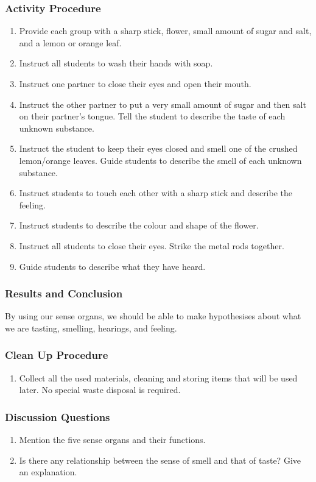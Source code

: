 \subsubsection*{Activity Procedure}
\begin{enumerate}
\item{Provide each group with a sharp stick, flower, small amount of sugar and salt, and a lemon or orange leaf.}
\item{Instruct all students to wash their hands with soap.}
\item{Instruct one partner to close their eyes and open their mouth.}
\item{Instruct the other partner to put a very small amount of sugar and then salt on their partner's tongue. Tell the student to describe the taste of each unknown substance.}
\item{Instruct the student to keep their eyes closed and smell one of the crushed lemon/orange leaves. Guide students to describe the smell of each unknown substance.}
\item{Instruct students to touch each other with a sharp stick and describe the feeling.}
\item{Instruct students to describe the colour and shape of the flower.}
\item{Instruct all students to close their eyes. Strike the metal rods together.}
\item{Guide students to describe what they have heard.}
\end{enumerate}

\subsubsection*{Results and Conclusion}
By using our sense organs, we should be able to make hypothesises about what we are tasting, smelling, hearings, and feeling.

\subsubsection*{Clean Up Procedure}
\begin{enumerate}
\item{Collect all the used materials, cleaning and storing items that will be used later. No special waste disposal is required.}
\end{enumerate}

\subsubsection*{Discussion Questions}
\begin{enumerate}
\item{Mention the five sense organs and their functions.}
\item{Is there any relationship between the sense of smell and that of taste? Give an explanation.}
\end{enumerate}

